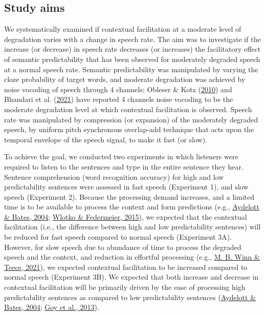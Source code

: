 \documentclass[a4paper, nobind]{templates/ociamthesis}
\begin{document}
\hypertarget{study-aims}{%
\subsection{Study aims}\label{study-aims}}

We systematically examined if contextual facilitation at a moderate level of degradation varies with a change in speech rate.
The aim was to investigate if the increase (or decrease) in speech rate decreases (or increases) the facilitatory effect of semantic predictability that has been observed for moderately degraded speech at a normal speech rate.
Semantic predictability was manipulated by varying the cloze probability of target words, and moderate degradation was achieved by noise vocoding of speech through 4 channels;
Obleser \& Kotz (\protect\hyperlink{ref-Obleser2010}{2010}) and Bhandari et al. (\protect\hyperlink{ref-Bhandari2021}{2021}) have reported 4 channels noise vocoding to be the moderate degradation level at which contextual facilitation is observed.
Speech rate was manipulated by compression (or expansion) of the moderately degraded speech, by uniform pitch synchronous overlap-add technique that acts upon the temporal envelope of the speech signal, to make it fast (or slow).

To achieve the goal, we conducted two experiments in which listeners were required to listen to the sentences and type in the entire sentence they hear.
Sentence comprehension (word recognition accuracy) for high and low predictability sentences were assessed in fast speech (Experiment 1), and slow speech (Experiment 2).
Because the processing demand increases, and a limited time is to be available to process the context and form predictions (e.g., \protect\hyperlink{ref-Aydelott2004}{Aydelott \& Bates, 2004}; \protect\hyperlink{ref-Wlotko2015}{Wlotko \& Federmeier, 2015}), we expected that the contextual facilitation (i.e., the difference between high and low predictability sentences) will be reduced for fast speech compared to normal speech (Experiment 3A).
However, for slow speech due to abundance of time to process the degraded speech and the context, and reduction in effortful processing (e.g., \protect\hyperlink{ref-Winn2021b}{M. B. Winn \& Teece, 2021}), we expected contextual facilitation to be increased compared to normal speech (Experiment 3B).
We expected that both increase and decrease in contextual facilitation will be primarily driven by the ease of processing high predictability sentences as compared to low predictability sentences (\protect\hyperlink{ref-Aydelott2004}{Aydelott \& Bates, 2004}; \protect\hyperlink{ref-Goy2013}{Goy et al., 2013}).
\end{document}
